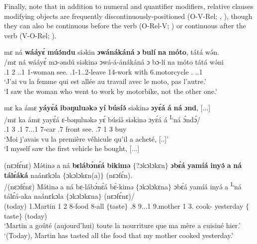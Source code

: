 \documentclass[output=paper,colorlinks,citecolor=brown
]{langscibook}
\begin{document}
Finally, note that in addition to numeral and quantifier modifiers, relative clauses modifying objects are frequently discontinuously-positioned (O-V-Rel; , ), though they can also be continuous before the verb (O-Rel-V; ) or continuous after the verb (V-O-Rel; ).

\ea
\label{relativemotorbike}
\glll
{\db}mɛ ná \textbf{wááyɛ́} \textbf{múə́ndu} siəkin \textbf{ɔwánákáná} {} \textbf{ɔ} \textbf{bulí} \textbf{na} \textbf{móto}, tátá wə́n. \\
/mɛ ná wááyɛ́ mɔ-əndú siəkinə ɔwá-á-ánákáná ɔ bɔ-lí na móto tátá wə́ni \\
{\db}\SM{}.1\SG{} \PST{}2 \DEM{}.\DISC{}.1 1-woman see.\DUR{} \REL{}.1{}-1\SM{}.\REL{}.\PST{}2{}-leave \PREP{} 14-work with 6.motorcycle \COP{}.\NEG{} \DEM.\DIST.1 \\
\glt
`J'ai vu la femme qui est allée au travail avec le moto, pas l'autre.' \\ `I saw the woman who went to work by motorbike, not the other one.' \jambox*{[PB 2019] }

 
 \z
 
\ea
\label{relativevehicle}
\glll
{\db}mɛ ka ámɛ \textbf{yáyɛ́á} \textbf{ibəŋuluəkə} \textbf{yí} \textbf{búsíə́} siəkinə \textbf{ɔyɛ́á} \textbf{á} \textbf{\ds{}ná} \textbf{ɔnd}, [...] \\
/mɛ ka ámɛ yayɛ́á ɛ-bəŋuluəkə yɛ́ búsíə́ siəkinə ɔyɛ́á á \textsuperscript{L}ná ɔ́ndɔ́/ \\
{\db}\SM{}.1\SG{} \PST{}3{} \PRO{}.1\SG{} 7{}.\PRO{}.\POSS{}.1{} 7-car \ASS{}.7{} front see.\DUR{} \REL{}.7{} 1\SM{} \PST{}3{} buy \\
\glt
`Moi j'avais vu la première véhicule qu'il a acheté, [..]' \\ `I myself saw the first vehicle he bought, [...] \jambox*{[PM 1084] }

 \z 
 
\ea
\label{relativeMartinfood}
\glll
{\db}(nɛɔfɛ́nɛ) Mə́tinə a ná \textbf{bɛlábɔ́nɛ́á} \textbf{bikimə} $\{$?ɔkɔlɔkɛn$\}$ \textbf{ɔbɛ́á} \textbf{yamíá} \textbf{inyə́} \textbf{a} \textbf{\ds{}ná} \textbf{tálɛ́áká} naánɛkɔla $\{$ɔkɔlɔkɛn(a)$\}$ (nɛɔfɛ́n). \\
/(nɛɔfɛ́nɛ) Mə́tinə a ná bɛ-lábɔ́nɛ́á bɛ́-kimə $\{$ɔkɔlɔkɛna$\}$ ɔbɛ́á yamíá inyə́ a \textsuperscript{L}ná tálɛ́á-aka naánɛkɔla $\{$ɔkɔlɔkɛna$\}$ (nɛɔfɛ́nɛ)/ \\
{\db}(today) 1.Martin 1\SM{} \PST{}2{} 8-food 8-all $\{$taste$\}$ \REL{}.8{} 9{}.\POSS{}.\PRO{}.1\SG{} 9.mother 1\SM{} \PST{}3.\REL{} cook-\DUR{} yesterday $\{$taste$\}$ (today) \\
\glt
`Martin a goûté (aujourd'hui) toute la nourriture que ma mère a cuisiné hier.' \\ `(Today), Martin has tasted all the food that my mother cooked yesterday.' \jambox*{[PM 498] } 
\end{document}
